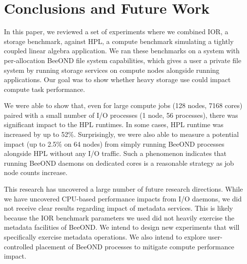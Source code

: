 \section{Conclusions and Future Work}

In this paper, we reviewed a set of experiments where we combined IOR, a storage benchmark, against HPL, a compute benchmark simulating a tightly coupled linear algebra application. We ran these benchmarks on a system with per-allocation BeeOND file system capabilities, which gives a user a private file system by running storage services on compute nodes alongside running applications. Our goal was to show whether heavy storage use could impact compute task performance.

We were able to show that, even for large compute jobs (128 nodes, 7168 cores) paired with a small number of I/O processes (1 node, 56 processes), there was significant impact to the HPL runtimes. In some cases, HPL runtime was increased by up to 52\%. Surprisingly, we were also able to measure a potential impact (up to 2.5\% on 64 nodes) from simply running BeeOND processes alongside HPL without any I/O traffic. Such a phenomenon indicates that running BeeOND daemons on dedicated cores is a reasonable strategy as job node counts increase.

This research has uncovered a large number of future research directions. While we have uncovered CPU-based performance impacts from I/O daemons, we did not receive clear results regarding impact of metadata services. This is likely because the IOR benchmark parameters we used did not heavily exercise the metadata facilities of BeeOND. We intend to design new experiments that will specifically exercise metadata operations. We also intend to explore user-controlled placement of BeeOND processes to mitigate compute performance impact.
